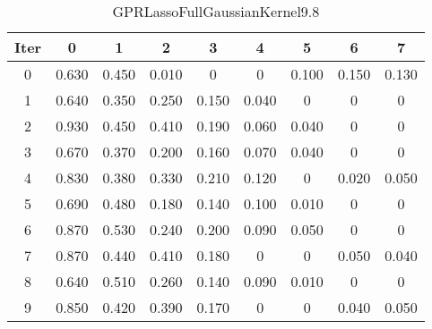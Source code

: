 \begin{table}
	\begin{center}
		\begin{tabular}{|c|c|c|c|c|c|c|c|c|}
			\hline
			Iter & 0 & 1 & 2 & 3 & 4 & 5 & 6 & 7 \\
			\hline
			0 & 0.630 & 0.450 & 0.010 & 0 & 0 & 0.100 & 0.150 & 0.130 \\
			\hline
			1 & 0.640 & 0.350 & 0.250 & 0.150 & 0.040 & 0 & 0 & 0 \\
			\hline
			2 & 0.930 & 0.450 & 0.410 & 0.190 & 0.060 & 0.040 & 0 & 0 \\
			\hline
			3 & 0.670 & 0.370 & 0.200 & 0.160 & 0.070 & 0.040 & 0 & 0 \\
			\hline
			4 & 0.830 & 0.380 & 0.330 & 0.210 & 0.120 & 0 & 0.020 & 0.050 \\
			\hline
			5 & 0.690 & 0.480 & 0.180 & 0.140 & 0.100 & 0.010 & 0 & 0 \\
			\hline
			6 & 0.870 & 0.530 & 0.240 & 0.200 & 0.090 & 0.050 & 0 & 0 \\
			\hline
			7 & 0.870 & 0.440 & 0.410 & 0.180 & 0 & 0 & 0.050 & 0.040 \\
			\hline
			8 & 0.640 & 0.510 & 0.260 & 0.140 & 0.090 & 0.010 & 0 & 0 \\
			\hline
			9 & 0.850 & 0.420 & 0.390 & 0.170 & 0 & 0 & 0.040 & 0.050 \\
			\hline
		\end{tabular}
	\end{center}
	\caption{GPRLassoFullGaussianKernel9.8}
\end{table}